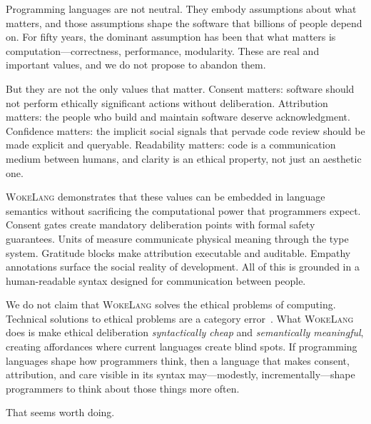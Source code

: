 \documentclass[11pt,a4paper]{article}
\newcommand{\WokeLang}{\textsc{WokeLang}}
\begin{document}
Programming languages are not neutral.  They embody assumptions about
what matters, and those assumptions shape the software that billions
of people depend on.  For fifty years, the dominant assumption has
been that what matters is computation---correctness, performance,
modularity.  These are real and important values, and we do not
propose to abandon them.

But they are not the only values that matter.  Consent matters:
software should not perform ethically significant actions without
deliberation.  Attribution matters: the people who build and maintain
software deserve acknowledgment.  Confidence matters: the implicit
social signals that pervade code review should be made explicit and
queryable.  Readability matters: code is a communication medium
between humans, and clarity is an ethical property, not just an
aesthetic one.

\WokeLang{} demonstrates that these values can be embedded in
language semantics without sacrificing the computational power that
programmers expect.  Consent gates create mandatory deliberation
points with formal safety guarantees.  Units of measure communicate
physical meaning through the type system.  Gratitude blocks make
attribution executable and auditable.  Empathy annotations surface
the social reality of development.  All of this is grounded in a
human-readable syntax designed for communication between people.

We do not claim that \WokeLang{} solves the ethical problems of
computing.  Technical solutions to ethical problems are a category
error~\citep{green2019good}.  What \WokeLang{} does is make ethical
deliberation \emph{syntactically cheap} and \emph{semantically
meaningful}, creating affordances where current languages create blind
spots.  If programming languages shape how programmers think, then a
language that makes consent, attribution, and care visible in its
syntax may---modestly, incrementally---shape programmers to think
about those things more often.

That seems worth doing.


\end{document}
